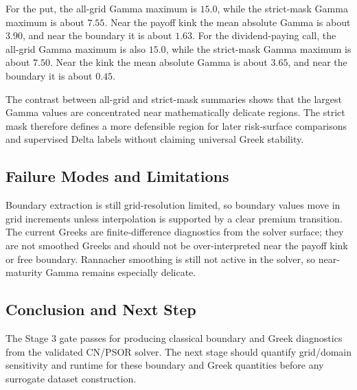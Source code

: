 \documentclass[11pt]{article}
\begin{document}
For the put, the all-grid Gamma maximum is $15.0$, while the strict-mask Gamma maximum is about $7.55$. Near the payoff kink the mean absolute Gamma is about $3.90$, and near the boundary it is about $1.63$. For the dividend-paying call, the all-grid Gamma maximum is also $15.0$, while the strict-mask Gamma maximum is about $7.50$. Near the kink the mean absolute Gamma is about $3.65$, and near the boundary it is about $0.45$.

The contrast between all-grid and strict-mask summaries shows that the largest
Gamma values are concentrated near mathematically delicate regions. The strict
mask therefore defines a more defensible region for later risk-surface
comparisons and supervised Delta labels without claiming universal Greek
stability.



\subsection{Failure Modes and Limitations}
Boundary extraction is still grid-resolution limited, so boundary values move in grid increments unless interpolation is supported by a clear premium transition. The current Greeks are finite-difference diagnostics from the solver surface; they are not smoothed Greeks and should not be over-interpreted near the payoff kink or free boundary. Rannacher smoothing is still not active in the solver, so near-maturity Gamma remains especially delicate.

\subsection{Conclusion and Next Step}
The Stage 3 gate passes for producing classical boundary and Greek diagnostics from the validated CN/PSOR solver. The next stage should quantify grid/domain sensitivity and runtime for these boundary and Greek quantities before any surrogate dataset construction.
\end{document}
